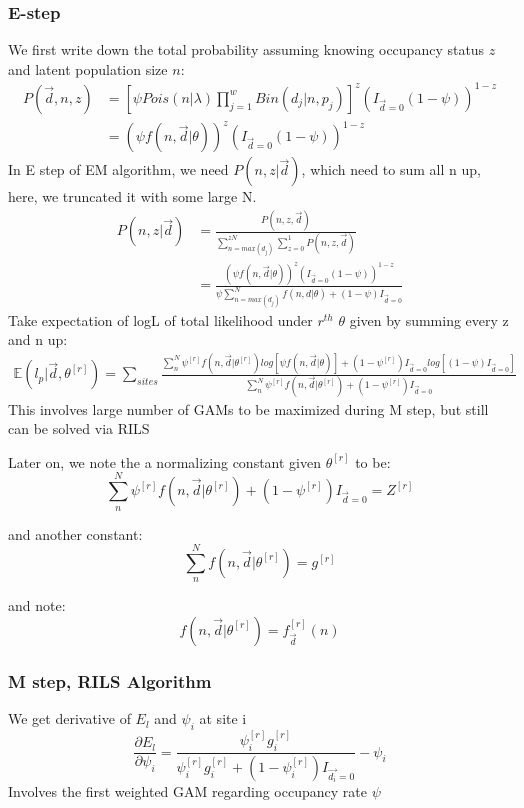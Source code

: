 \documentclass[]{article}
\begin{document}
\subsubsection{E-step}
We first write down the total probability assuming knowing occupancy status $z$ and latent population size $n$:
\begin{equation}
	\begin{aligned}
	P(\vec{d},n,z)&=[\psi Pois(n|\lambda)\prod_{j=1}^{w}Bin(d_{j}|n,p_{j})]^{z}(I_{\vec{d}=0}(1-\psi))^{1-z}\\
	&=(\psi f(n,\vec{d}|\theta))^{z}(I_{\vec{d}=0}(1-\psi))^{1-z}
	\end{aligned}
\end{equation}
In E step of EM algorithm, we need $P(n,z|\vec{d})$, which need to sum all n up, here, we truncated it with some large N.
\begin{equation}
	\begin{aligned}
	P(n,z|\vec{d})&=\frac{P(n,z,\vec{d})}{\sum_{n=max(d_{j})}^{zN}\sum_{z=0}^{1}P(n,z,\vec{d})}\\
	&=\frac{(\psi f(n,\vec{d}|\theta))^{z}(I_{\vec{d}=0}(1-\psi))^{1-z}}{\psi \sum_{n=max(d_{j})}^{N}f(n,d|\theta)+(1-\psi)I_{\vec{d}=0}}
	\end{aligned}
\end{equation}
Take expectation of logL of total likelihood under $r^{th}$ $\theta$ given by summing every z and n up:
\begin{equation}
	\begin{aligned}
	\mathbb{E}(l_{p}|\vec{d},\theta^{[r]})=\sum_{sites}\frac{\sum_{n}^{N}\psi^{[r]}f(n,\vec{d}|\theta^{[r]})log[\psi f(n,\vec{d}|\theta)]+(1-\psi^{[r]})I_{\vec{d}=0}log[(1-\psi)I_{\vec{d}=0}]}{\sum_{n}^{N}\psi^{[r]}f(n,\vec{d}|\theta^{[r]})+(1-\psi^{[r]})I_{\vec{d}=0}}
	\end{aligned}
\end{equation}
This involves large number of GAMs to be maximized during M step, but still can be solved via RILS

Later on, we note the a normalizing constant given $\theta^{[r]}$ to be:
\[
\sum_{n}^{N}\psi^{[r]}f(n,\vec{d}|\theta^{[r]})+(1-\psi^{[r]})I_{\vec{d}=0}=Z^{[r]}
\]

and another constant:
\[
\sum_{n}^{N}f(n,\vec{d}|\theta^{[r]})=g^{[r]}
\]

and note:
\[
f(n,\vec{d}|\theta^{[r]})=f^{[r]}_{\vec{d}}(n)
\]

\subsubsection{M step, RILS Algorithm}
We get derivative of $E_{l}$ and $\psi_{i}$ at site i
\begin{equation}
	\frac{\partial E_{l}}{\partial \psi_{i}}=\frac{\psi_{i}^{[r]}g_{i}^{[r]}}{\psi_{i}^{[r]}g_{i}^{[r]}+(1-\psi_{i}^{[r]})I_{\vec{d_{i}}=0}}-\psi_{i}
\end{equation}
Involves the first weighted GAM regarding occupancy rate $\psi$
\end{document}
